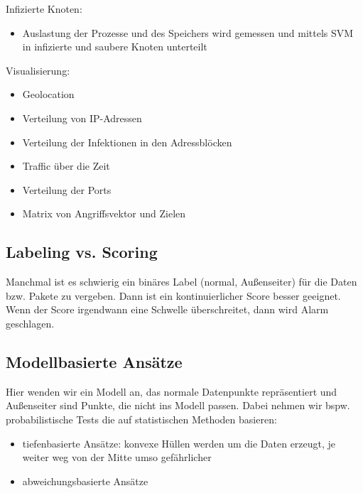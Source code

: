 Infizierte Knoten:
\begin{itemize}
  \item Auslastung der Prozesse und des Speichers wird gemessen
    und mittels SVM in infizierte und saubere Knoten unterteilt
\end{itemize}

Visualisierung:
\begin{itemize}
  \item Geolocation
  \item Verteilung von IP-Adressen
  \item Verteilung der Infektionen in den Adressblöcken
  \item Traffic über die Zeit
  \item Verteilung der Ports
  \item Matrix von Angriffsvektor und Zielen
\end{itemize}

\subsection{Labeling vs. Scoring}%
\label{sub:labeling_vs_scoring}

Manchmal ist es schwierig ein binäres Label (normal, Außenseiter) für die Daten bzw.
Pakete zu vergeben.
Dann ist ein kontinuierlicher Score besser geeignet.
Wenn der Score irgendwann eine Schwelle überschreitet, dann wird Alarm geschlagen.

\subsection{Modellbasierte Ansätze}%
\label{sub:modellbasierte_ansatze}

Hier wenden wir ein Modell an, das normale Datenpunkte repräsentiert und Außenseiter sind
Punkte, die nicht ins Modell passen.
Dabei nehmen wir bspw. probabilistische Tests die auf statistischen Methoden basieren:
\begin{itemize}
  \item tiefenbasierte Ansätze: konvexe Hüllen werden um die Daten erzeugt, je weiter weg
    von der Mitte umso gefährlicher
  \item abweichungsbasierte Ansätze
\end{itemize}
